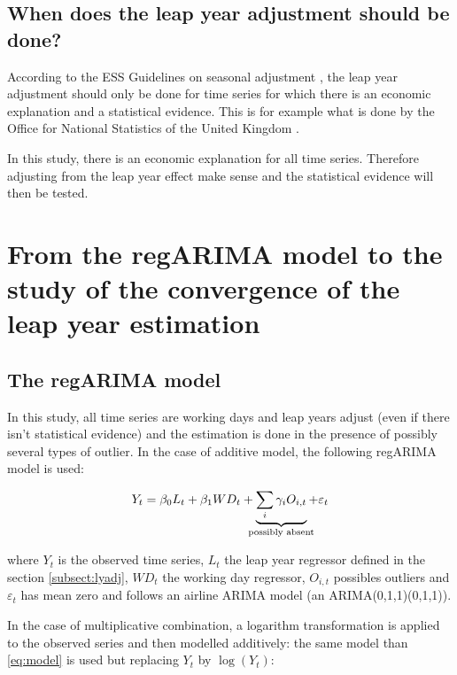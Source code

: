\documentclass[]{article}
\theoremstyle{definition}
\theoremstyle{definition}
\theoremstyle{definition}
\theoremstyle{remark}
\begin{document}
\subsection{When does the leap year adjustment should be
done?}\label{when-does-the-leap-year-adjustment-should-be-done}

According to the ESS Guidelines on seasonal adjustment
\citep{eurostat2015guidelines}, the leap year adjustment should only be
done for time series for which there is an economic explanation and a
statistical evidence. This is for example what is done by the Office for
National Statistics of the United Kingdom \citep{ons2016noteonleapyear}.

In this study, there is an economic explanation for all time series.
Therefore adjusting from the leap year effect make sense and the
statistical evidence will then be tested.

\section{From the regARIMA model to the study of the convergence of the
leap year
estimation}\label{from-the-regarima-model-to-the-study-of-the-convergence-of-the-leap-year-estimation}

\subsection{The regARIMA model}\label{subsect:regarima}

In this study, all time series are working days and leap years adjust
(even if there isn't statistical evidence) and the estimation is done in
the presence of possibly several types of outlier. In the case of
additive model, the following regARIMA model is used:

\begin{equation} 
Y_t = \beta_0 L_t + \beta_1 WD_t + 
\underbrace{\sum_{i}\gamma_iO_{i,t}}_{\mathclap{\text{possibly absent}}} + \varepsilon_t
 \label{eq:model}
\end{equation}

where \(Y_t\) is the observed time series, \(L_t\) the leap year
regressor defined in the section \ref{subsect:lyadj}, \(WD_t\) the
working day regressor, \(O_{i,t}\) possibles outliers and
\(\varepsilon_t\) has mean zero and follows an airline ARIMA model (an
ARIMA(0,1,1)(0,1,1)).

In the case of multiplicative combination, a logarithm transformation is
applied to the observed series and then modelled additively: the same
model than \eqref{eq:model} is used but replacing \(Y_t\) by
\(\log (Y_t)\):
\end{document}
